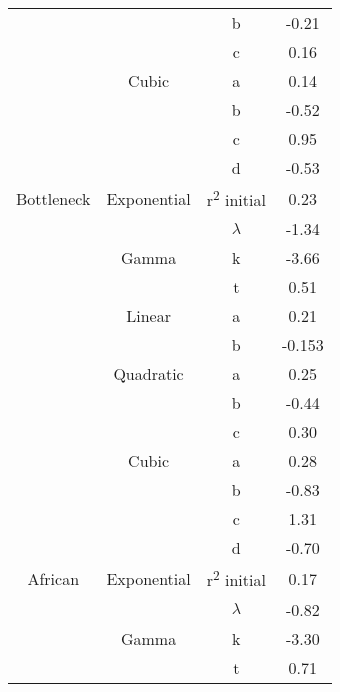 \documentclass[11pt]{article}
\begin{document}
\begin{longtable}{c c c c}
           &             & b                          & -0.21         \\  
           &             & c                          & 0.16          \\  
           & Cubic       & a                          & 0.14          \\  
           &             & b                          & -0.52         \\  
           &             & c                          & 0.95          \\  
           &             & d                          & -0.53         \\  \hline
Bottleneck & Exponential & r\textsuperscript2 initial & 0.23          \\  
           &             & $\lambda$                  & -1.34         \\  
           & Gamma       & k                          & -3.66         \\  
           &             & t                          & 0.51          \\  
           & Linear      & a                          & 0.21          \\  
           &             & b                          & -0.153        \\  
           & Quadratic   & a                          & 0.25          \\  
           &             & b                          & -0.44         \\  
           &             & c                          & 0.30          \\  
           & Cubic       & a                          & 0.28          \\  
           &             & b                          & -0.83         \\  
           &             & c                          & 1.31          \\  
           &             & d                          & -0.70         \\  \hline
African    & Exponential & r\textsuperscript2 initial & 0.17          \\  
           &             & $\lambda$                  & -0.82         \\  
           & Gamma       & k                          & -3.30         \\  
           &             & t                          & 0.71          \\  

\end{longtable}
\end{document}
